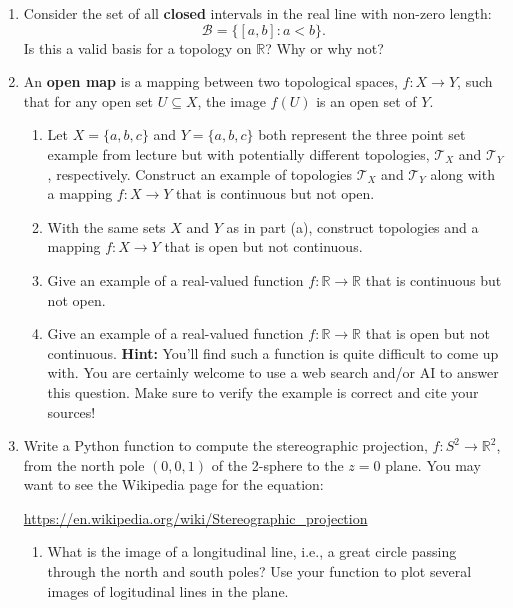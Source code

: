 \documentclass[11pt]{article}
\begin{document}
\begin{enumerate}

\item Consider the set of all {\bf closed} intervals in the real line with
  non-zero length:
  $$\mathcal{B} = \{[a, b] : a < b\}.$$
  Is this a valid basis for a topology on $\mathbb{R}$? Why or why not?

\item An {\bf open map} is a mapping between two topological spaces,
  $f : X \rightarrow Y$, such that for any open set $U \subseteq X$, the image
  $f(U)$ is an open set of $Y$.

  \begin{enumerate}
  \item Let $X = \{a, b, c\}$ and $Y = \{a, b, c\}$ both represent the three
    point set example from lecture but with potentially different topologies,
    $\mathcal{T}_X$ and $\mathcal{T}_Y$, respectively. Construct an example of
    topologies $\mathcal{T}_X$ and $\mathcal{T}_Y$ along with a mapping
    $f: X \rightarrow Y$ that is continuous but not open.

  \item With the same sets $X$ and $Y$ as in part (a), construct topologies and
    a mapping ${f:X \rightarrow Y}$ that is open but not continuous.

  \item Give an example of a real-valued function
    $f : \mathbb{R} \rightarrow \mathbb{R}$ that is continuous but not open.

  \item Give an example of a real-valued function
    $f : \mathbb{R} \rightarrow \mathbb{R}$ that is open but not
    continuous. {\bf Hint:} You'll find such a function is quite difficult to
    come up with. You are certainly welcome to use a web search and/or AI to
    answer this question. Make sure to verify the example is correct and cite
    your sources!
  \end{enumerate}

\item Write a Python function to compute the stereographic projection,
  $f: S^2 \rightarrow \mathbb{R}^2$, from the north pole $(0,0,1)$ of the
  2-sphere to the $z = 0$ plane. You may want to see the Wikipedia page for the
  equation:
  \begin{center}
    \url{https://en.wikipedia.org/wiki/Stereographic_projection}
  \end{center}

  \begin{enumerate}
  \item What is the image of a longitudinal line, i.e., a great circle passing
    through the north and south poles? Use your function to plot several images
    of logitudinal lines in the plane.


\end{enumerate}
\end{enumerate}
\end{document}
